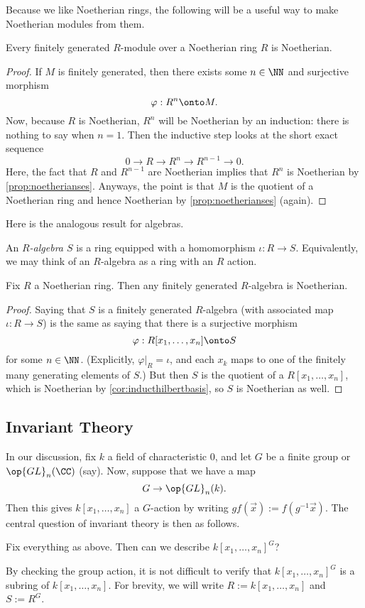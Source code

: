 Because we like Noetherian rings, the following will be a useful way to make Noetherian modules from them.
\begin{proposition}
	Every finitely generated $R$-module over a Noetherian ring $R$ is Noetherian.
\end{proposition}
\begin{proof}
	If $M$ is finitely generated, then there exists some $n\in\NN$ and surjective morphism
	\[\varphi:R^n\onto M.\]
	Now, because $R$ is Noetherian, $R^n$ will be Noetherian by an induction: there is nothing to say when $n=1$. Then the inductive step looks at the short exact sequence
	\[0\to R\to R^n\to R^{n-1}\to 0.\]
	Here, the fact that $R$ and $R^{n-1}$ are Noetherian implies that $R^n$ is Noetherian by \autoref{prop:noetherianses}. Anyways, the point is that $M$ is the quotient of a Noetherian ring and hence Noetherian by \autoref{prop:noetherianses} (again).
\end{proof}
Here is the analogous result for algebras.
\begin{definition}[Algebra]
	An \textit{$R$-algebra $S$} is a ring equipped with a homomorphism $\iota:R\to S$. Equivalently, we may think of an $R$-algebra as a ring with an $R$ action.
\end{definition}
\begin{prop}
	Fix $R$ a Noetherian ring. Then any finitely generated $R$-algebra is Noetherian.
\end{prop}
\begin{proof}
	Saying that $S$ is a finitely generated $R$-algebra (with associated map $\iota:R\to S$) is the same as saying that there is a surjective morphism
	\[\varphi:R[x_1,\ldots,x_n]\onto S\]
	for some $n\in\NN$. (Explicitly, $\varphi|_R=\iota$, and each $x_k$ maps to one of the finitely many generating elements of $S$.) But then $S$ is the quotient of a $R[x_1,\ldots,x_n]$, which is Noetherian by \autoref{cor:inducthilbertbasis}, so $S$ is Noetherian as well.
\end{proof}

\subsection{Invariant Theory}
In our discussion, fix $k$ a field of characteristic $0$, and let $G$ be a finite group or $\op{GL}_n(\CC)$ (say). Now, suppose that we have a map
\[G\to\op{GL}_n(k).\]
Then this gives $k[x_1,\ldots,x_n]$ a $G$-action by writing $gf(\vec x):=f(g^{-1}\vec x).$ The central question of invariant theory is then as follows.
\begin{ques}
	Fix everything as above. Then can we describe $k[x_1,\ldots,x_n]^G$?
\end{ques}
By checking the group action, it is not difficult to verify that $k[x_1,\ldots,x_n]^G$ is a subring of $k[x_1,\ldots,x_n]$. For brevity, we will write $R:=k[x_1,\ldots,x_n]$ and $S:=R^G$.

